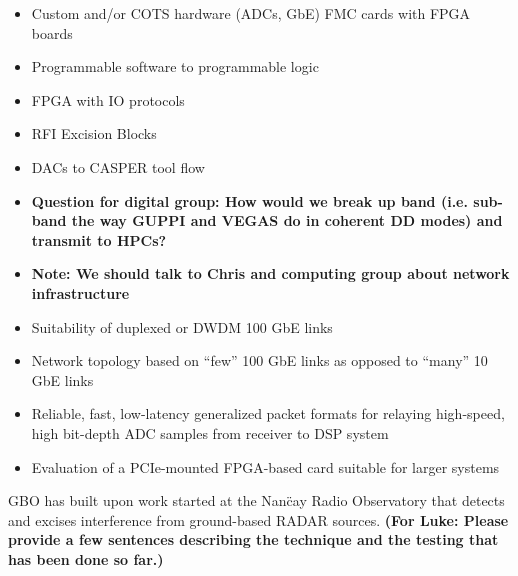 \documentclass[10pt]{myNSF}
\begin{document}

\begin{itemize}
\item{Custom and/or COTS hardware (ADCs, GbE) FMC cards with FPGA boards}
\item{Programmable software to programmable logic}
\item{FPGA with IO protocols}
\item{RFI Excision Blocks}
\item{DACs to CASPER tool flow}
\end{itemize}


\begin{itemize}
  \item{\textbf{Question for digital group: How would we break up band
        (i.e. sub-band the way GUPPI and VEGAS do in coherent DD modes)
        and transmit to HPCs?}}
  \item{\textbf{Note: We should talk to Chris and computing group
        about network infrastructure}}
\item{Suitability of duplexed or DWDM 100 GbE links}
\item{Network topology based on ``few'' 100 GbE links as opposed to
    ``many'' 10 GbE links}
\item{Reliable, fast, low-latency generalized packet formats for
    relaying high-speed, high bit-depth ADC samples from receiver to
    DSP system}
\item{Evaluation of a PCIe-mounted FPGA-based card suitable for larger
    systems}
\end{itemize}



 GBO has built upon work started
at the Nan\"{c}ay Radio Observatory that detects and excises
interference from ground-based RADAR sources.  \textbf{(For Luke:
  Please provide a few sentences describing the technique and the
  testing that has been done so far.)}  
\end{document}
